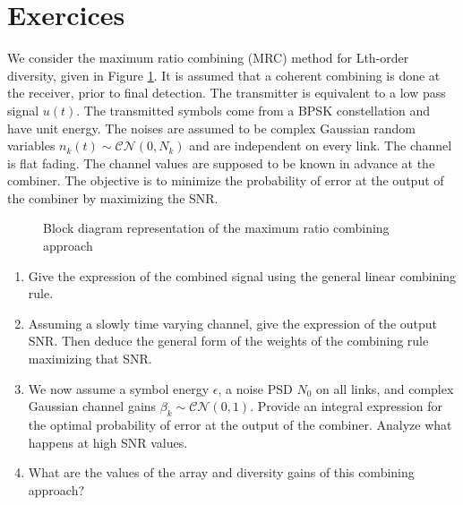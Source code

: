\documentclass [a4paper, 11pt] {article}
\begin{document}
    \part*{Exercices}

    \begin{exercise}{1}
        We consider the maximum ratio combining (MRC) method for Lth-order diversity, given in Figure \ref{fig:combining}. It is assumed that a coherent combining is done at the receiver, prior to final detection. The transmitter is equivalent to a low pass signal $u(t)$. The transmitted symbols come from a BPSK constellation and have unit energy. The noises are assumed to be complex Gaussian random variables $n_k(t) \sim \mathcal{C}\mathcal{N}(0,N_k)$ and are independent on every link. The channel is flat fading. The channel values are supposed to be known in advance at the combiner. The objective is to minimize the probability of error at the output of the combiner by maximizing the SNR.

            \begin{figure}[H]
            \centering
            
            \caption{Block diagram representation of the maximum ratio combining approach}
            \label{fig:combining}
            \end{figure}

        \begin{enumerate}
        \item Give the expression of the combined signal using the general linear combining rule.
        \item Assuming a slowly time varying channel, give the expression of the output SNR. Then deduce the general form of the weights of the combining rule maximizing that SNR.
        \item We now assume a symbol energy $\epsilon$, a noise PSD $N_0$ on all links, and complex Gaussian channel gains $\beta_k \sim \mathcal{C}\mathcal{N}(0,1)$. Provide an integral expression for the optimal probability of error at the output of the combiner. Analyze what happens at high SNR values.
        \item What are the values of the array and diversity gains of this combining approach?
        \end{enumerate}
    \end{exercise}
\end{document}
